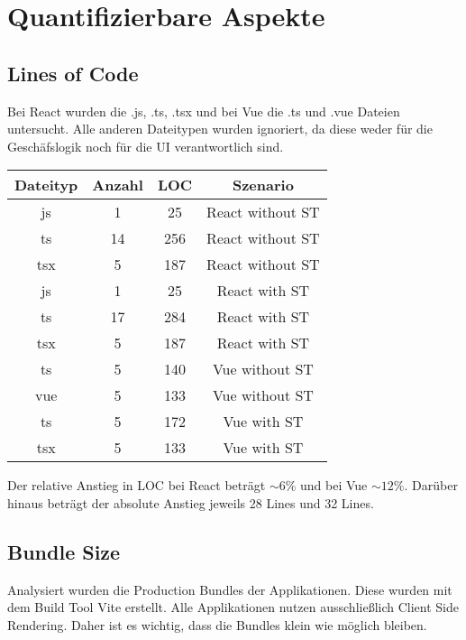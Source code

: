 \section{Quantifizierbare Aspekte}
\subsection{Lines of Code}

Bei React wurden die .js, .ts, .tsx und bei Vue die .ts und .vue Dateien untersucht. Alle anderen Dateitypen wurden ignoriert, da diese weder für die Geschäfslogik noch für die UI verantwortlich sind.

\begin{center}
  \begin{tabular}{|c|c|c|c|} 
   \hline
   Dateityp & Anzahl & LOC & Szenario \\ [0.5ex] 
   \hline\hline
   js & 1 & 25 & React without ST \\ 
   \hline
   ts & 14 & 256 & React without ST \\
   \hline
   tsx & 5 & 187 & React without ST \\
   \hline\hline
   js & 1 & 25 & React with ST \\ 
   \hline
   ts & 17 & 284 & React with ST \\
   \hline
   tsx & 5 & 187 & React with ST \\
   \hline\hline
   ts & 5 & 140 & Vue without ST \\
   \hline
   vue & 5 & 133 & Vue without ST \\
   \hline\hline
   ts & 5 & 172 & Vue with ST \\
   \hline
   tsx & 5 & 133 & Vue with ST \\
   \hline
  \end{tabular}
\end{center}

Der relative Anstieg in LOC bei React beträgt $\sim6\%$ und bei Vue $\sim12\%$. Darüber hinaus beträgt der absolute Anstieg jeweils 28 Lines und 32 Lines.

\subsection{Bundle Size}

Analysiert wurden die Production Bundles der Applikationen. Diese wurden mit dem Build Tool Vite erstellt. Alle Applikationen nutzen ausschließlich Client Side Rendering. Daher ist es wichtig, dass die Bundles klein wie möglich bleiben.

